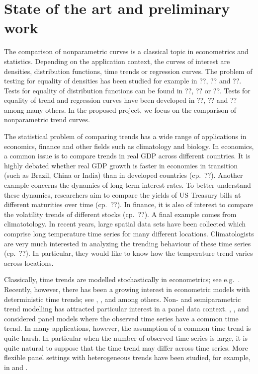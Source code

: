 \documentclass[a4paper,12pt]{article}
\begin{document}



\section{State of the art and preliminary work}


The comparison of nonparametric curves is a classical topic in econometrics and statistics. Depending on the application context, the curves of interest are densities, distribution functions, time trends or regression curves. The problem of testing for equality of densities has been studied for example in ??, ?? and ??. Tests for equality of distribution functions can be found in ??, ?? or ??. Tests for equality of trend and regression curves have been developed in ??, ?? and ?? among many others. In the proposed project, we focus on the comparison of nonparametric trend curves.


The statistical problem of comparing trends has a wide range of applications in economics, finance and other fields such as climatology and biology. In economics, a common issue is to compare trends in real GDP across different countries. It is highly debated whether real GDP growth is faster in economies in transition (such as Brazil, China or India) than in developed countries (cp.\ ??). Another example concerns the dynamics of long-term interest rates. To better understand these dynamics, researchers aim to compare the yields of US Treasury bills at different maturities over time (cp.\ ??). In finance, it is also of interest to compare the volatility trends of different stocks (cp.\ ??). A final example comes from climatotology. In recent years, large spatial data sets have been collected which comprise long temperature time series for many different locations. Climatologists are very much interested in analyzing the trending behaviour of these time series (cp.\ ??). In particular, they would like to know how the temperature trend varies across locations. 


Classically, time trends are modelled stochastically in econometrics; see e.g.\ \cite{Stock1988}. Recently, however, there has been a growing interest in econometric models with deterministic time trends; see \cite{Cai2007}, \cite{Atak2011}, \cite{Robinson2012} and \cite{ChenGaoLi2012} among others. Non- and semiparametric trend modelling has attracted particular interest in a panel data context. \cite{LiChenGao2010}, \cite{Atak2011}, \cite{Robinson2012} and \cite{ChenGaoLi2012} considered panel models where the observed time series have a common time trend. In many applications, however, the assumption of a common time trend is quite harsh. In particular when the number of observed time series is large, it is quite natural to suppose that the time trend may differ across time series. More flexible panel settings with heterogeneous trends have been studied, for example, in \cite{Zhang2012} and \cite{Hidalgo2014}. 
\end{document}
